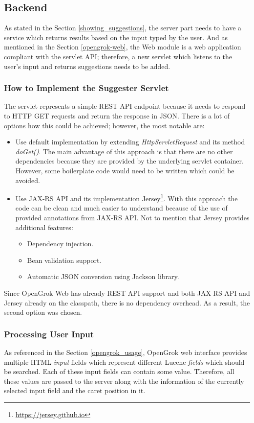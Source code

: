 \subsection{Backend}
As stated in the Section \ref{showing_suggestions}, the server part needs to have a service which returns results based on the
input typed by the user. And as mentioned in the Section \ref{opengrok-web}, the Web module is a web application compliant with
the servlet API; therefore, a new servlet which listens to the user's input and returns suggestions needs to be added.

\subsubsection{How to Implement the Suggester Servlet}
The servlet represents a simple REST API endpoint
because it needs to respond to HTTP GET requests and return the response in JSON.
There is a lot of options how this could be achieved; however, the most notable are:
\begin{itemize}
    \item Use default implementation by extending \textit{HttpServletRequest} and its method \textit{doGet()}. The main
    advantage of this approach is that there are no other dependencies because they are provided by the underlying servlet container.
     However, some boilerplate code would need
    to be written which could be avoided.
    \item Use JAX-RS API and its implementation Jersey\footnote{\url{https://jersey.github.io}}. With this approach the
    code can be clean and much easier to understand because of the use of provided annotations from JAX-RS API.
    Not to mention that Jersey provides additional features:
    \begin{itemize}
        \item Dependency injection.
        \item Bean validation support.
        \item Automatic JSON conversion using Jackson library.
    \end{itemize}
\end{itemize}

Since OpenGrok Web has already REST API support and both JAX-RS API and Jersey already on the classpath,
there is no dependency overhead. As a result, the second option was chosen.

\subsubsection{Processing User Input}
\label{processing_user_input}
As referenced in the Section \ref{opengrok_usage}, OpenGrok web interface provides multiple HTML \textit{input} fields which
represent different Lucene \textit{fields} which should be searched. Each of these input fields can contain some value.
Therefore, all these values are passed to the server along with the information of the currently selected input field and
the caret position in it.

